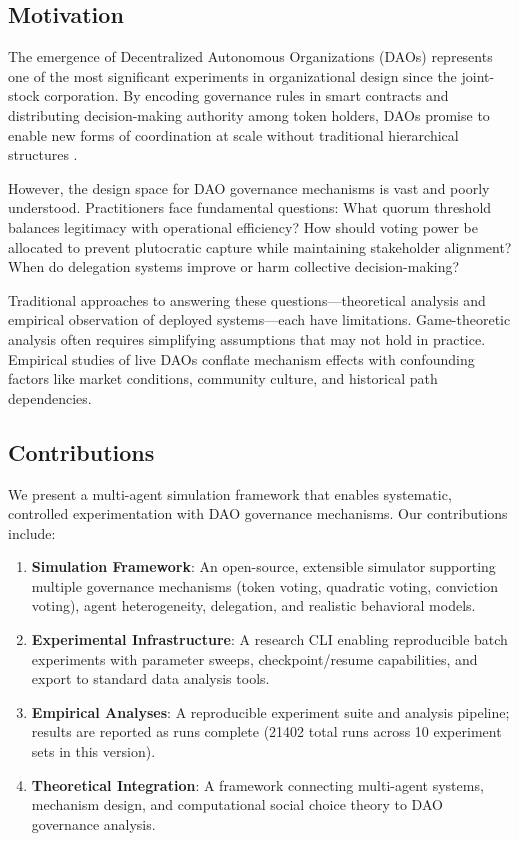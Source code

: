 
\subsection{Motivation}

The emergence of Decentralized Autonomous Organizations (DAOs) represents one of the most significant experiments in organizational design since the joint-stock corporation. By encoding governance rules in smart contracts and distributing decision-making authority among token holders, DAOs promise to enable new forms of coordination at scale without traditional hierarchical structures \citep{buterin2014dao, wright2015decentralized}.

However, the design space for DAO governance mechanisms is vast and poorly understood. Practitioners face fundamental questions: What quorum threshold balances legitimacy with operational efficiency? How should voting power be allocated to prevent plutocratic capture while maintaining stakeholder alignment? When do delegation systems improve or harm collective decision-making?

Traditional approaches to answering these questions---theoretical analysis and empirical observation of deployed systems---each have limitations. Game-theoretic analysis often requires simplifying assumptions that may not hold in practice. Empirical studies of live DAOs conflate mechanism effects with confounding factors like market conditions, community culture, and historical path dependencies.

\subsection{Contributions}

We present a multi-agent simulation framework that enables systematic, controlled experimentation with DAO governance mechanisms. Our contributions include:

\begin{enumerate}
    \item \textbf{Simulation Framework}: An open-source, extensible simulator supporting multiple governance mechanisms (token voting, quadratic voting, conviction voting), agent heterogeneity, delegation, and realistic behavioral models.

    \item \textbf{Experimental Infrastructure}: A research CLI enabling reproducible batch experiments with parameter sweeps, checkpoint/resume capabilities, and export to standard data analysis tools.

    \item \textbf{Empirical Analyses}: A reproducible experiment suite and analysis pipeline; results are reported as runs complete (21402 total runs across 10 experiment sets in this version).

    \item \textbf{Theoretical Integration}: A framework connecting multi-agent systems, mechanism design, and computational social choice theory to DAO governance analysis.
\end{enumerate}

